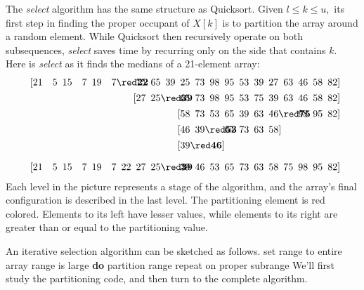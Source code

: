 The {\it select} algorithm has the same structure as Quicksort. Given $l\le
k\le u,$ its first step in finding the proper occupant of $X[k]$ is to
partition the array around a random element. While Quicksort then recursively
operate on both subsequences, {\it select} saves time by recurring only on the
side that contains $k.$ Here is {\it select} as it finds the medians of a
21-element array:
$$
\centerline{\vbox{\baselineskip=16pt
\halign{&\hbox to15pt{\hfil\strut#}\cr
[21&5&15&7&19&7&{\red\bf22}&75&65&39&25&73&98&95&53&39&27&63&46&58&82\rlap{]}\cr
&&&&&&&[27&25&{\red\bf39}&65&73&98&95&53&75&39&63&46&58&82\rlap{]}\cr
&&&&&&&&&&[58&73&53&65&39&63&46&{\red\bf75}&98&95&82\rlap{]}\cr
&&&&&&&&&&[46&39&{\red\bf53}&65&73&63&58\rlap{]}&&&&\cr
&&&&&&&&&&[39&{\red\bf46}\rlap{]}&&&&&&&&&\cr
\noalign{\medskip}
[21&5&15&7&19&7&22&27&25&{\red\bf39}&39&46&53&65&73&63&58&75&98&95&82\rlap{]}\cr
}}}
$$
Each level in the picture represents a stage of the algorithm, and the array's
final configuration is described in the last level. The partitioning element
is red colored. Elements to its left have lesser values, while elements to its
right are greater than or equal to the partitioning value.

An iterative selection algorithm can be sketched as follows.
\begindisplay
\vbox{
\+set range to entire array\cr
{} range is large {\bf do}\cr
\+\quad partition range\cr
\+\quad repeat on proper subrange\cr}
\enddisplay
We'll first study the partitioning code, and then turn to the complete
algorithm.

